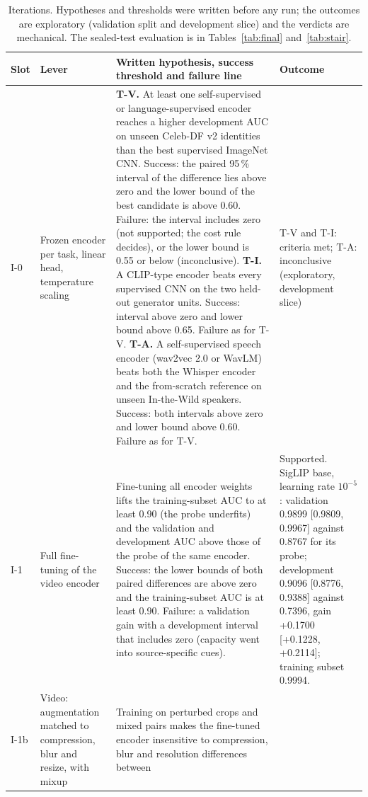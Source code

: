 \documentclass[conference,a4paper]{IEEEtran_nodash}
\begin{document}
\begin{table}[!t]
\centering
\caption[Iteration slots]{Iterations. Hypotheses and thresholds were written before any run; the outcomes
are exploratory (validation split and development slice) and the verdicts are
mechanical. The sealed-test evaluation is in Tables~\ref{tab:final}
and~\ref{tab:stair}.}
\label{tab:iters}
\small
\begin{tabular}{@{}l L{2.4cm} L{7.1cm} L{3.8cm}@{}}
\toprule
Slot & Lever & Written hypothesis, success threshold and failure line & Outcome \\
\midrule
I-0 &
Frozen encoder per task, linear head, temperature scaling &
\textbf{T-V.} At least one self-supervised or language-supervised encoder
reaches a higher development AUC on unseen Celeb-DF v2 identities than the best
supervised ImageNet CNN. Success: the paired 95\,\% interval of the difference
lies above zero and the lower bound of the best candidate is above 0.60.
Failure: the interval includes zero (not supported; the cost rule decides), or
the lower bound is 0.55 or below (inconclusive).
\textbf{T-I.} A CLIP-type encoder beats every supervised CNN on the two held-out
generator units. Success: interval above zero and lower bound above 0.65.
Failure as for T-V.
\textbf{T-A.} A self-supervised speech encoder (wav2vec 2.0 or WavLM) beats both
the Whisper encoder and the from-scratch reference on unseen In-the-Wild
speakers. Success: both intervals above zero and lower bound above 0.60.
Failure as for T-V. &
T-V and T-I: criteria met; T-A: inconclusive (exploratory, development slice) %
\\
\addlinespace[3pt]
I-1 & Full fine-tuning of the video encoder &
Fine-tuning all encoder weights lifts the training-subset AUC to at least 0.90
(the probe underfits) and the validation and development AUC above those of the
probe of the same encoder. Success: the lower bounds of both paired differences
are above zero and the training-subset AUC is at least 0.90. Failure: a
validation gain with a development interval that includes zero (capacity went
into source-specific cues). &
Supported. SigLIP base, learning rate $10^{-5}$: validation 0.9899 [0.9809,
0.9967] against 0.8767 for its probe; development 0.9096 [0.8776, 0.9388]
against 0.7396, gain +0.1700 [+0.1228, +0.2114]; training subset 0.9994. %
\\
\addlinespace[3pt]
I-1b & Video: augmentation matched to compression, blur and resize, with mixup &
Training on perturbed crops and mixed pairs makes the fine-tuned encoder
insensitive to compression, blur and resolution differences between

\end{tabular}
\end{table}
\end{document}
